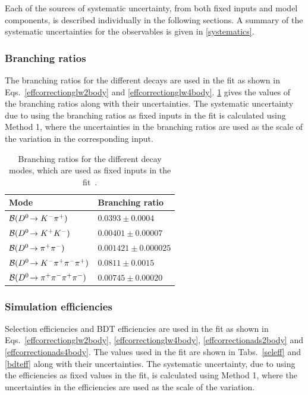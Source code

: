 Each of the sources of systematic uncertainty, from both fixed inputs and model components, is described individually in the following sections. A summary of the systematic uncertainties for the \CP observables is given in \tab\ref{systematics}.

\subsubsection{Branching ratios}

The branching ratios for the different \Dz decays are used in the \CP fit as shown in Eqs.~\ref{effcorrectionglw2body} and \ref{effcorrectionglw4body}. \Tab\ref{BR} gives the values of the branching ratios along with their uncertainties. The systematic uncertainty due to using the branching ratios as fixed inputs in the \CP fit is calculated using Method 1, where the uncertainties in the branching ratios are used as the scale of the variation in the corresponding input.

\begin{table}
\centering
\begin{tabular}{l|l}
\hline
Mode & Branching ratio \\
\hline
$\mathcal{B}({{D}^0}\!\rightarrow {\ensuremath{{K}^-}}{\ensuremath{{\pi}^+}})$ & $0.0393 \pm 0.0004$ \\
$\mathcal{B}({{D}^0}\!\rightarrow {\ensuremath{{K}^+}}{\ensuremath{{K}^-}})$ & $0.00401 \pm 0.00007$ \\
$\mathcal{B}({{D}^0}\!\rightarrow {\ensuremath{{\pi}^+}}{\ensuremath{{\pi}^-}})$ & $0.001421 \pm 0.000025$ \\
$\mathcal{B}({{D}^0}\!\rightarrow {\ensuremath{{K}^-}}{\ensuremath{{\pi}^+}}{\ensuremath{{\pi}^-}}{\ensuremath{{\pi}^+}})$ & $0.0811 \pm 0.0015$ \\
$\mathcal{B}({{D}^0}\!\rightarrow {\ensuremath{{\pi}^+}}{\ensuremath{{\pi}^-}}{\ensuremath{{\pi}^+}}{\ensuremath{{\pi}^-}})$ & $0.00745 \pm 0.00020$ \\
\hline
\end{tabular}
\caption{Branching ratios for the different \Dz decay modes, which are used as fixed inputs in the \CP fit~\cite{PDG2014}.}
\label{BR}
\end{table}

\subsubsection{Simulation efficiencies}

Selection efficiencies and BDT efficiencies are used in the \CP fit as shown in Eqs.~\ref{effcorrectionglw2body}, \ref{effcorrectionglw4body}, \ref{effcorrectionads2body} and \ref{effcorrectionads4body}. The values used in the \CP fit are shown in Tabs.~\ref{seleff} and \ref{bdteff} along with their uncertainties. The systematic uncertainty, due to using the efficiencies as fixed values in the \CP fit, is calculated using Method 1, where the uncertainties in the efficiencies are used as the scale of the variation.

